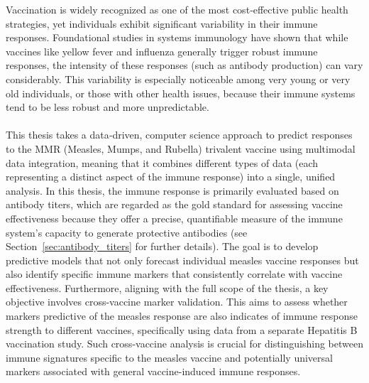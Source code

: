 \documentclass[12pt,a4paper]{report}
\newcommand{\remark}[1]{%
  \par\noindent%
  \begin{tcolorbox}[ colback=orange!20!white, colframe=orange!80!black, boxrule=0.5pt, sharp corners, width=\linewidth, ]
    {\textbf{\textcolor{orange!80!black}!REMARK:}}~#1
  \end{tcolorbox}%
}
\begin{document}
Vaccination is widely recognized as one of the most cost‑effective public health strategies, yet individuals exhibit significant variability in their immune responses. Foundational studies in systems immunology \cite{castrucci2018factors,brodin2017human} have shown that while vaccines like yellow fever and influenza generally trigger robust immune responses, the intensity of these responses (such as antibody production) can vary considerably. This variability is especially noticeable among very young or very old individuals, or those with other health issues, because their immune systems tend to be less robust and more unpredictable.\\
\\
This thesis takes a data‑driven, computer science approach to predict responses to the MMR (Measles, Mumps, and Rubella) trivalent vaccine using multimodal data integration, meaning that it combines different types of data (each representing a distinct aspect of the immune response) into a single, unified analysis. In this thesis, the immune response is primarily evaluated based on antibody titers, which are regarded as the gold standard for assessing vaccine effectiveness because they offer a precise, quantifiable measure of the immune system’s capacity to generate protective antibodies \cite{plotkin2010correlates} (see Section~\ref{sec:antibody_titers} for further details). The goal is to develop predictive models that not only forecast individual measles vaccine responses but also identify specific immune markers that consistently correlate with vaccine effectiveness. Furthermore, aligning with the full scope of the thesis, a key objective involves cross-vaccine marker validation. This aims to assess whether markers predictive of the measles response are also indicates of immune response strength to different vaccines, specifically using data from a separate Hepatitis B vaccination study. Such cross-vaccine analysis is crucial for distinguishing between immune signatures specific to the measles vaccine and potentially universal markers associated with general vaccine-induced immune responses.\\
\\
\end{document}

